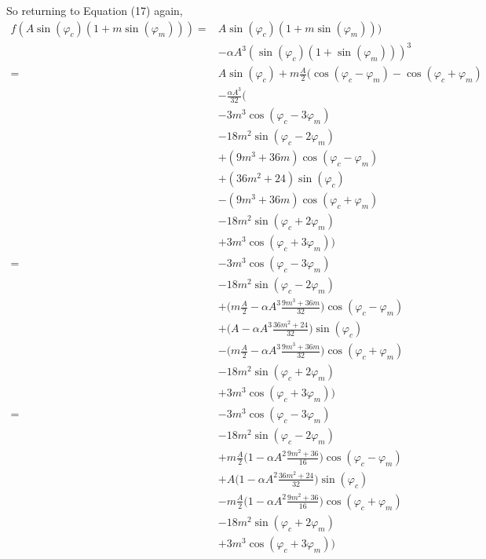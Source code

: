 \documentclass[12pt]{article}
\begin{document}
So returning to Equation (17) again,
\begin{equation}
\begin{aligned}
f(A \sin(\varphi_c) \left( 1 + m \sin(\varphi_m) \right))   = & A \sin(\varphi_c) \left( 1 + m \sin(\varphi_m) \right)) \\
            & - \alpha A^3 ( \sin(\varphi_c) (1+ \sin(\varphi_m) ) )^3 \\
            = &  A \sin(\varphi_c) + 
    m \frac{A}{2} ( \cos(\varphi_c - \varphi_m) - \cos(\varphi_c + \varphi_m) \\
            & - \frac{\alpha A^3}{32} \Big( \\
& -3 m^3 \cos(\varphi_c - 3 \varphi_m) \\
& -18 m^2 \sin(\varphi_c - 2 \varphi_m) \\
& + (9 m^3 + 36m) \cos(\varphi_c - \varphi_m) \\
& + (36 m^2 +24)\sin(\varphi_c) \\
& - (9 m^3 +36 m) \cos(\varphi_c + \varphi_m) \\
& - 18 m^2 \sin(\varphi_c + 2 \varphi_m) \\
& + 3 m^3 \cos(\varphi_c + 3 \varphi_m) \Big) \\
=  
& -3 m^3 \cos(\varphi_c - 3 \varphi_m) \\
& -18 m^2 \sin(\varphi_c - 2 \varphi_m) \\
& + \Big( m\frac{A}{2} - \alpha A^3 \frac{9 m^3 + 36m}{32} \Big) \cos(\varphi_c - \varphi_m) \\
& + \Big( A - \alpha A^3 \frac{36 m^2 +24}{32} \big) \sin(\varphi_c) \\
& - \Big( m\frac{A}{2} - \alpha A^3 \frac{9 m^3 + 36m}{32} \Big) \cos(\varphi_c + \varphi_m) \\
& - 18 m^2 \sin(\varphi_c + 2 \varphi_m) \\
& + 3 m^3 \cos(\varphi_c + 3 \varphi_m) \Big) \\
=
& -3 m^3 \cos(\varphi_c - 3 \varphi_m) \\
& -18 m^2 \sin(\varphi_c - 2 \varphi_m) \\
& + m\frac{A}{2} \Big( 1 - \alpha A^2 \frac{9 m^2 + 36}{16} \Big) \cos(\varphi_c - \varphi_m) \\
& + A \Big( 1 - \alpha A^2 \frac{36 m^2 +24}{32} \big) \sin(\varphi_c) \\
& - m\frac{A}{2} \Big( 1 - \alpha A^2 \frac{9 m^2 + 36}{16} \Big) \cos(\varphi_c + \varphi_m) \\
& - 18 m^2 \sin(\varphi_c + 2 \varphi_m) \\
& + 3 m^3 \cos(\varphi_c + 3 \varphi_m) \Big)
\end{aligned}
\end{equation}
\end{document}
